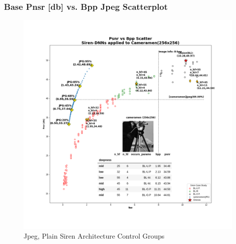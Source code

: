 
\begin{frame}
    \frametitle{Base Pnsr [db] vs. Bpp Jpeg Scatterplot}
    \begin{figure}
    \includegraphics[scale=0.23]{slides/experiments/target-image/images/cameramen_jpeg_plain_siren_1.png}
    \caption{Jpeg, Plain Siren Architecture Control Groups}
    \end{figure}
\end{frame}
